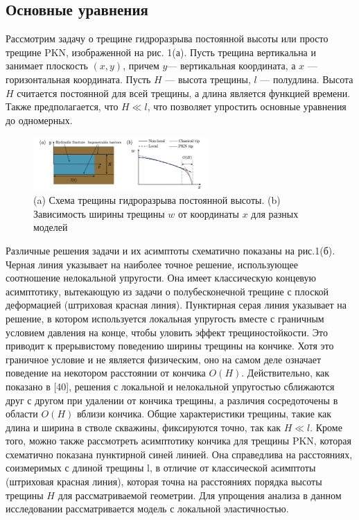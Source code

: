 \documentclass[a4paper, 12pt]{article}
\begin{document}
\subsection{Основные уравнения}

Рассмотрим задачу о трещине гидроразрыва постоянной высоты или просто трещине PKN, изображенной на рис. 1(а).
Пусть трещина вертикальна и занимает плоскость $(x, y)$, причем $y$— вертикальная координата, а $x$ — горизонтальная координата.
Пусть $H$ — высота трещины, $l$ — полудлина.
Высота $H$ считается постоянной для всей трещины, а длина является функцией времени.
Также предполагается, что $H\ll l$, что позволяет упростить основные уравнения до одномерных.

\begin{figure}[H]
\center
\includegraphics[width=0.6\textwidth]{Dontsov-2021-fig1}
\caption{(a) Схема трещины гидроразрыва постоянной высоты. (b) Зависимость ширины трещины $w$ от координаты $x$ для разных моделей}
\label{fig:Dontsov-2021-fig1}
\end{figure}

Различные решения задачи и их асимптоты схематично показаны на рис.1(б).
Черная линия указывает на наиболее точное решение, использующее соотношение нелокальной упругости.
Она имеет классическую концевую асимптотику, вытекающую из задачи о полубесконечной трещине с плоской деформацией (штриховая красная линия).
Пунктирная серая линия указывает на решение, в котором используется локальная упругость вместе с граничным условием давления на конце, чтобы уловить эффект трещиностойкости.
Это приводит к прерывистому поведению ширины трещины на кончике.
Хотя это граничное условие и не является физическим, оно на самом деле означает поведение на некотором расстоянии от кончика $O(H)$.
Действительно, как показано в [40], решения с локальной и нелокальной упругостью сближаются друг с другом при удалении от кончика трещины, а различия сосредоточены в области $O(H)$ вблизи кончика.
Общие характеристики трещины, такие как длина и ширина в стволе скважины, фиксируются точно, так как $H\ll l$.
Кроме того, можно также рассмотреть асимптотику кончика для трещины PKN, которая схематично показана пунктирной синей линией.
Она справедлива на расстояниях, соизмеримых с длиной трещины l, в отличие от классической асимптоты (штриховая красная линия), которая точна на расстояниях порядка высоты трещины $H$ для рассматриваемой геометрии.
Для упрощения анализа в данном исследовании рассматривается модель с локальной эластичностью.
\end{document}
